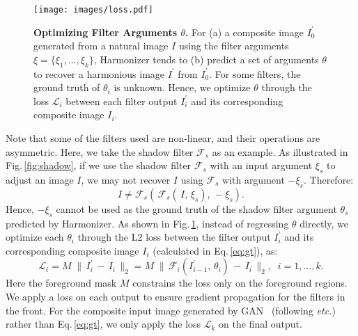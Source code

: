 \documentclass[runningheads]{llncs}
\begin{document}
 \begin{figure}[t]
\centering
\texttt{[image: images/loss.pdf]}
{\begin{center}
\vspace{-0.5cm}
\caption{\textbf{Optimizing Filter Arguments $\theta$.} For (a) a composite image $I^{\prime}_{0}$ generated from a natural image $I$ using the filter arguments $\xi=\{\xi_1, \dots, \xi_k\}$, Harmonizer tends to (b) predict a set of arguments $\theta$ to recover a harmonious image $I^{\prime}$ from $I^{\prime}_{0}$. For some filters, the ground truth of $\theta_i$ is unknown. Hence, we optimize $\theta$ through the loss $\mathcal{L}_i$ between each filter output $I^{\prime}_{i}$ and its corresponding composite image $I_i$.}
\label{fig:loss}
\end{center}
}
\vspace{-0.7cm}
\end{figure}

Note that some of the filters used are non-linear, and their operations are asymmetric. Here, we take the shadow filter $\mathcal{F}_{s}$ as an example. As illustrated in Fig.\,\ref{fig:shadow}, if we use the shadow filter $\mathcal{F}_{s}$ with an input argument $\xi_s$ to adjust an image $I$, we may not recover $I$ using $\mathcal{F}_{s}$ with argument $-\xi_s$. Therefore:
\begin{equation}
    I \neq \mathcal{F}_s(\,\mathcal{F}_s ( \, I, \, \xi_s),\, -\xi_s).
\end{equation}
Hence, $-\xi_s$ cannot be used as the ground truth of the shadow filter argument $\theta_s$ predicted by Harmonizer. As shown in Fig.\,\ref{fig:loss}, instead of regressing $\theta$ directly, we optimize each $\theta_i$ through the L2 loss between the filter output $I^{\prime}_i$ and its corresponding composite image $I_i$ (calculated in Eq.\,\ref{eq:gt}), as:
\begin{equation}
    \mathcal{L}_i = M\; \|\,I^{\prime}_i\, - \,I_i\,\|_{2} = M\; \|\,\mathcal{F}_{i} (I^{\prime}_{i-1},\, \theta_i)\, - \,I_i\,\|_{2}, \;\; i=1, \dots, k.
\end{equation}
Here the foreground mask $M$ constrains the loss only on the foreground regions. 
We apply a loss on each output to ensure gradient propagation for the filters in the front. 
For the composite input image generated by GAN~\cite{GAN} (following \cite{DoveNet,BargainNet,TransformerIH} {\it etc.}) rather than Eq.\,\ref{eq:gt}, we only apply the loss $\mathcal{L}_{k}$ on the final output.
\end{document}
